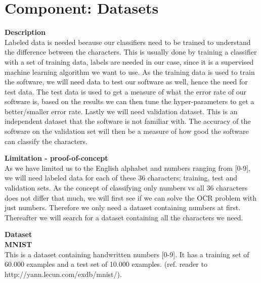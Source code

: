 \documentclass[11pt,a4paper,UKenglish]{report}
\begin{document}
\section{Component: Datasets}
\label{Method:Datasets}

\begin{flushleft}
  \textbf{Description} \\
  Labeled data is needed because our classifiers need to be trained to understand
  the difference between the characters. This is usually done by training a
  classifier with a set of training data, labels are needed in our case,
  since it is a supervised machine learning algorithm we want to use. As the
  training data is used to train the software, we will need data to test our
  software as well, hence the need for test data. The test data is used to get a
  measure of what the error rate of our software is, based on the results we
  can then tune the hyper-parameters to get a better/smaller error rate. Lastly
  we will need validation dataset. This is an independent dataset that the software
  is not familiar with. The accuracy of the software on the validation set will
  then be a measure of how good the software can classify the characters.
\end{flushleft}

\begin{flushleft}
  \textbf{Limitation - proof-of-concept} \\
  As we have limited us to the English alphabet and numbers ranging from [0-9],
  we will need labeled data for each of these 36 characters; training, test and
  validation sets. As the concept of classifying only numbers vs all 36
  characters does not differ that much, we will first see if we can solve the OCR
  problem with just numbers. Therefore we only need a dataset containing numbers
  at first. Thereafter we will search for a dataset containing all the characters
  we need.
\end{flushleft}

\begin{flushleft}
  \textbf{Dataset} \\
  \textbf{MNIST} \\
  This is a dataset containing handwritten numbers [0-9].
  It has a training set of 60.000 examples and a test set of 10.000 examples.
  (ref. reader to http://yann.lecun.com/exdb/mnist/).
\end{flushleft}
\end{document}
